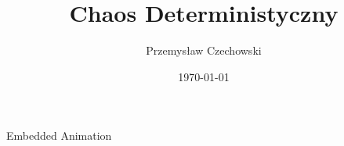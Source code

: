 \documentclass{beamer}
\begin{document}
\title{Chaos Deterministyczny} 
\author{Przemysław Czechowski} 
\date{\today} 

\frame{\titlepage} 



\begin{frame}{Embedded Animation}
\end{frame}
\end{document}
